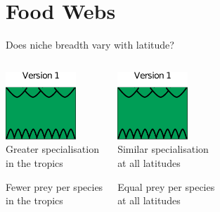 \documentclass{beamer}
\begin{document}
\section*{Food Webs}
  \begin{frame}{Does niche breadth vary with latitude?}
    \begin{columns}
    \column{.5in}
    \column{1.75in}
      \begin{center}
      \includegraphics[height=1in]{Figures/version1.eps}\\
      \vspace{.5cm}
      Greater specialisation\\in the tropics

      \vspace{.25cm}
      {\color{white}Fewer prey per species\\in the tropics}

      \end{center}
    \column{.5in}
    \column{1.75in}
      \begin{center}
      \includegraphics[height=1in]{Figures/version1.eps}\\
      \vspace{.5cm}
      Similar specialisation\\at all latitudes

      \vspace{.25cm}
      {\color{white}Equal prey per species\\at all latitudes}

      \end{center}
    \column{.5in}
    \end{columns}

  \end{frame}
\end{document}
